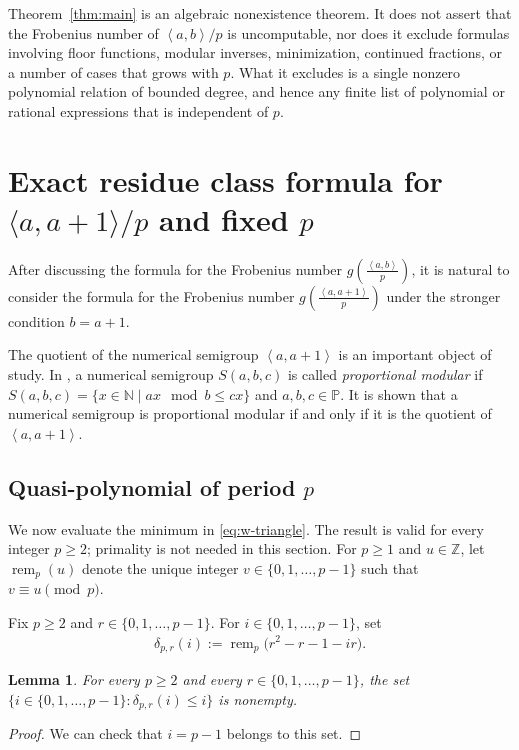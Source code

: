 \documentclass[reqno, 12pt]{article}
\numberwithin{equation}{section}
\newtheorem{lemma}[theorem]{Lemma}
\theoremstyle{definition}
\newcommand{\ZZ}{\mathbb{Z}}
\newcommand{\gen}[1]{\left\langle #1\right\rangle}
\newcommand{\remp}{\operatorname{rem}}
\begin{document}
Theorem~\ref{thm:main} is an algebraic nonexistence theorem.  It does not
assert that the Frobenius number of $\gen{a,b}/p$ is uncomputable, nor does it
exclude formulas involving floor functions, modular inverses, minimization,
continued fractions, or a number of cases that grows with $p$.  What it
excludes is a single nonzero polynomial relation of bounded degree, and hence
any finite list of polynomial or rational expressions that is independent of
$p$.


\section{Exact residue class formula for $\langle a,a+1\rangle/p$ and fixed $p$}\label{sec:exact}

After discussing the formula for the Frobenius number $g\!\left(\frac{\gen{a,b}}{p}\right)$, it is natural to consider the formula for the Frobenius number $g\!\left(\frac{\gen{a,a+1}}{p}\right)$ under the stronger condition $b=a+1$.

The quotient of the numerical semigroup $\gen{a,a+1}$ is an important object of study.
In \cite{Rosales03}, a numerical semigroup $S(a,b,c)$ is called \emph{proportional modular} if
$S(a,b,c)=\{x\in \mathbb{N} \mid ax \mod b \leq cx\}$ and $a,b,c \in \mathbb{P}$. 
It is shown \cite{AMRobles08} that a numerical semigroup is proportional modular if and only if it is the quotient of $\gen{a,a+1}$.


\subsection{Quasi-polynomial of period $p$}

We now evaluate the minimum in \cref{eq:w-triangle}.  The result is valid
for every integer $p\ge2$; primality is not needed in this section.
For $p\ge1$ and $u\in\ZZ$, let $\remp_p(u)$ denote the unique integer $v\in\{0,1,\ldots,p-1\}$ such that
$v\equiv u\pmod p$.

Fix $p\ge2$ and $r\in\{0,1,\ldots,p-1\}$.  For $i\in\{0,1,\ldots,p-1\}$, set
\begin{align*}
\delta_{p,r}(i):=\remp_p\bigl(r^2-r-1-ir\bigr).
\end{align*}

\begin{lemma}\label{lem:stopping-index}
For every $p\ge2$ and every $r\in\{0,1,\ldots,p-1\}$, the set $\{i\in\{0,1,\ldots,p-1\}:\delta_{p,r}(i)\le i\}$
is nonempty.
\end{lemma}
\begin{proof}
We can check that $i=p-1$ belongs to this set.
\end{proof}
\end{document}
